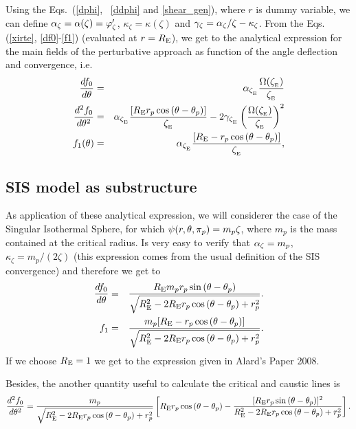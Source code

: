 Using the Eqs.~(\ref{dphi}, \, \ref{ddphi} and \ref{shear_gen}), where $r$ is dummy variable, we can define 
$\alpha_\zeta=\alpha(\zeta)=\varphi^\prime_\zeta$, $\kappa_\zeta=\kappa(\zeta)$ and $\gamma_\zeta=\alpha_\zeta/\zeta-\kappa_\zeta$. 
From the Eqs.(\ref{xirte}, \ref{df0}-\ref{f1}) (evaluated at $r=R_{\mathrm{E}}$), we get to the analytical expression for the main fields of
the perturbative approach as function of the angle deflection and convergence, i.e.
\begin{eqnarray}
\dfrac{df_0}{d\te}&=&\al_{\xie}\dfrac{\Omega(\xie)}{\xie}\\
\dfrac{d^2f_0}{d\te^2}&=& \al_{\xie}\dfrac{[\re r_p\cos{(\te-\tep)}]}{\xie}%
- 2\gamma_{\xie} \left(\dfrac{\Omega(\xie)}{\xie}\right)^2\\
f_1(\te)&=&\al_{\xie}\dfrac{[\re-r_p\cos{(\te-\tep)}]}{\xie},
\end{eqnarray}

\subsection{SIS model as substructure}

As application of these analytical expression, we will considerer the case of the Singular Isothermal Sphere, for
which $\psi(r,\theta,\pi_p)=m_p\zeta$, where $m_p$ is the mass contained at the critical radius.
Is very easy to verify that $\alpha_\zeta=m_p$,  $\kappa_\zeta=m_p/(2\zeta)$ (this expression comes from the usual
definition of the SIS convergence) and therefore we get to
\begin{eqnarray}
\dfrac{d f_0}{d\theta}&=&\dfrac{R_{\mathrm{E}} m_p r_p \sin{(\theta-\theta_p)}}{\sqrt{R_{\mathrm{E}}^2-2R_{\mathrm{E}} r_p\cos{(\theta-\theta_p)}+r^2_p}}.\\
f_1&=&\dfrac{m_p[R_{\mathrm{E}}-r_p\cos{(\theta-\theta_p)}]}{\sqrt{R_{\mathrm{E}}^2-2R_{\mathrm{E}} r_p\cos{(\theta-\theta_p)}+r^2_p}}.
\end{eqnarray}
If we choose $R_{\mathrm{E}}=1$ we get to the expression given in Alard's Paper 2008.

Besides, the another quantity useful to calculate the critical and caustic lines is
\begin{equation}
\dfrac{d^2 f_0}{d\te^2}=\dfrac{m_p}{\sqrt{\re^2-2\re r_p\cos{(\te-\tep)}+r^2_p}}%
\left[\re r_p\cos{(\te-\tep)}- \dfrac{[\re r_p\sin{(\te-\tep)}]^2}{\re^2-2\re r_p\cos{(\te-\tep)}+r^2_p} \right].
\end{equation}

